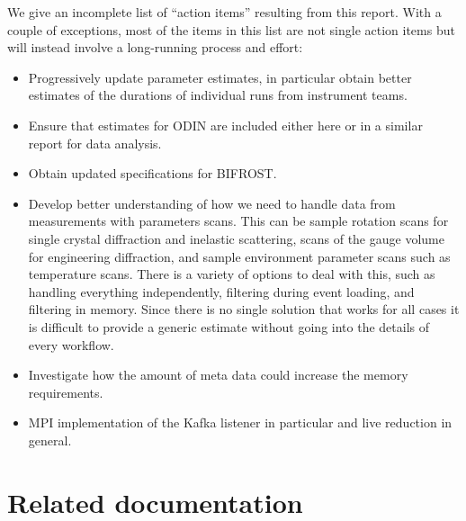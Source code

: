 \documentclass[a4paper,english,numbers=noenddot,bibliography=totoc,chapterprefix=on,DIV=12]{scrartcl}
\newcommand{\bifrost}{BIFROST\xspace}
\newcommand{\odin}{ODIN\xspace}
\begin{document}
We give an incomplete list of ``action items'' resulting from this report.
With a couple of exceptions, most of the items in this list are not single action items but will instead involve a long-running process and effort:
\begin{itemize}
  \item Progressively update parameter estimates, in particular obtain better estimates of the durations of individual runs from instrument teams.
  \item Ensure that estimates for \odin are included either here or in a similar report for data analysis.
  \item Obtain updated specifications for \bifrost.
  \item Develop better understanding of how we need to handle data from measurements with parameters scans.
    This can be sample rotation scans for single crystal diffraction and inelastic scattering, scans of the gauge volume for engineering diffraction, and sample environment parameter scans such as temperature scans.
    There is a variety of options to deal with this, such as handling everything independently, filtering during event loading, and filtering in memory.
    Since there is no single solution that works for all cases it is difficult to provide a generic estimate without going into the details of every workflow.
  \item Investigate how the amount of meta data could increase the memory requirements.
  \item MPI implementation of the Kafka listener in particular and live reduction in general.
\end{itemize}




\appendix




\section{Related documentation}
\label{app:refs}
\end{document}
